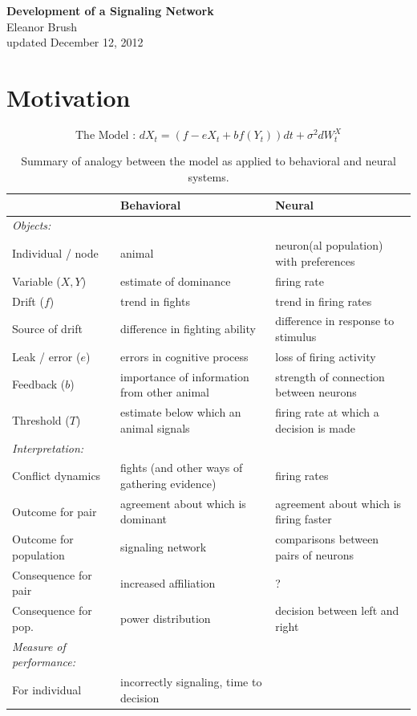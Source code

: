 \documentclass{article}
\newcommand{\ra}[1]{\renewcommand{\arraystretch}{#1}}
\begin{document}
\begin{center}
\Large

\end{center}


\vspace{0pt}

\begin{center}
{\bf \LARGE{Development of a Signaling Network}}
\vspace{10pt}
\\ Eleanor Brush
\\ updated December 12, 2012
\end{center}

\tableofcontents

\vspace{0pt}
\normalsize

\section{Motivation }

\begin{table}\centering
$$\text{The Model : }dX_t=\left(f-eX_t+bf(Y_t)\right)dt+\sigma^2 dW_t^X$$
\ra{1.3}
\begin{tabular}{@{}lll@{}}\toprule
& Behavioral  & Neural 
\\\midrule 
\emph{Objects: } \\
Individual / node & animal & neuron(al population) with preferences
\\ Variable ($X,Y$) & estimate of dominance  & firing rate
\\ Drift ($f$) &  trend in fights  & trend in firing rates
\\ Source of drift & difference in fighting ability & difference in response to stimulus
\\ Leak / error ($e$) & errors in cognitive process & loss of firing activity
\\ Feedback ($b$) & importance of information from other animal & strength of connection between neurons
\\ Threshold ($T$) & estimate below which an animal signals & firing rate at which a decision is made
\\ \midrule
\emph{Interpretation:} \\
Conflict dynamics & fights (and other ways of gathering evidence) & firing rates
\\ Outcome for pair & agreement about which is dominant & agreement about which is firing faster
\\ Outcome for population & signaling network & comparisons between pairs of neurons
\\ Consequence for pair & increased affiliation & ?
\\ Consequence for pop. & power distribution & decision between left and right
\\ \midrule 
\emph{Measure of performance:} \\
For individual & incorrectly signaling, time to decision & 
\\ \bottomrule
\end{tabular}
\caption{Summary of analogy between the model as applied to behavioral and neural systems.}
\end{table}
\end{document}
